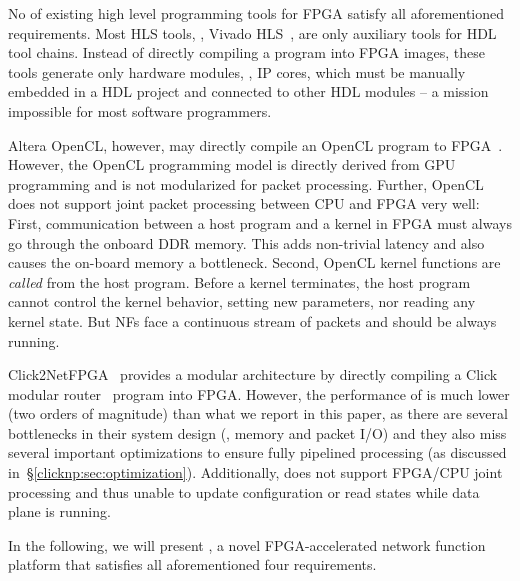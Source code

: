 No of existing high level programming tools for FPGA satisfy all aforementioned requirements.
Most HLS tools, \eg, Vivado HLS~\cite{vivado}, are only auxiliary tools 
for HDL tool chains. 
Instead of directly compiling a program into FPGA images, these tools generate only hardware 
modules, \ie, IP cores, which must be manually embedded in a HDL project and connected to other HDL modules
-- a mission impossible for most software programmers. 

Altera OpenCL, however, may directly compile an OpenCL program to FPGA~\cite{aoc}. 
However, the OpenCL programming model is directly derived from GPU programming and 
is not modularized for packet processing. 
%
Further, OpenCL does not support joint packet processing between CPU and FPGA very well:
%
First, communication between a host program and a kernel in FPGA must always go through the onboard DDR memory. This adds non-trivial latency
and also causes the on-board memory a bottleneck.
%
Second, OpenCL kernel functions are \textit{called} from the host program. 
Before a kernel terminates, the host program cannot control the kernel behavior, \eg setting new parameters, nor reading any kernel state. 
But NFs face a continuous stream of packets and should be always running.

Click2NetFPGA~\cite{Click2NetFPGA} provides a modular architecture by 
directly compiling a Click modular router~\cite{kohler2000click} program into FPGA.
%
However, the performance of \cite{Click2NetFPGA} is much lower (two orders of magnitude) than what we report in this paper, as there are several bottlenecks in their system design (\eg, memory and packet I/O) and they also miss 
several important
optimizations to ensure fully pipelined processing (as discussed in~\S\ref{clicknp:sec:optimization}). 
Additionally, \cite{Click2NetFPGA} does not support FPGA/CPU joint processing and thus unable to update configuration or read states while data plane is running.


In the following, we will present \name, a novel FPGA-accelerated 
network function platform that satisfies all aforementioned four requirements.


